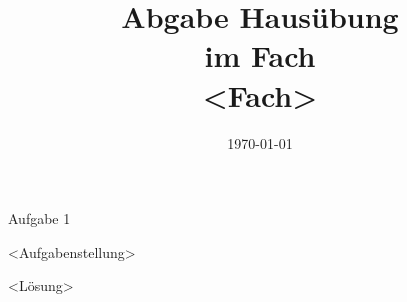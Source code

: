 \documentclass[
    ngerman,
    color=3b,
    submission,
    boxarc,
    fleqn,
]{rubos-tuda-template}
\date{\today}
\begin{document}

\title[Mathe 0]{Abgabe Hausübung\\im Fach\\ <Fach>}
\maketitle{}

\begin{task}[points=1]{Aufgabe 1}
    \begin{grayInfoBox}
         <Aufgabenstellung>
    \end{grayInfoBox}
        \loesung{} <Lösung>
\end{task}
\end{document}
